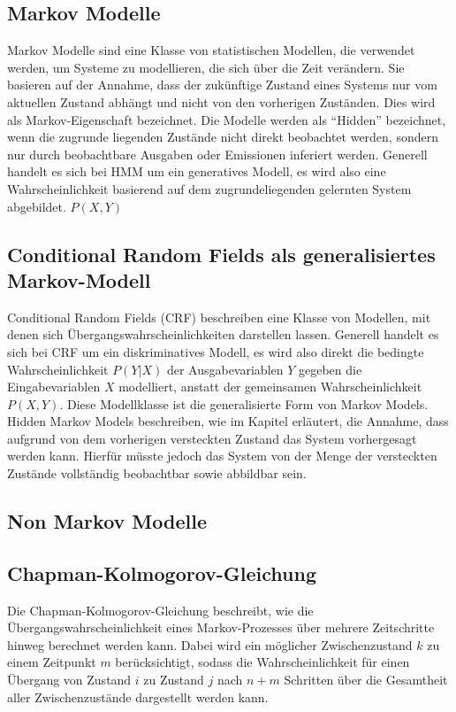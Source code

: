 \subsection{Markov Modelle}

Markov Modelle sind eine Klasse von statistischen Modellen, die verwendet werden, um Systeme zu modellieren, die sich über die Zeit verändern. Sie basieren auf der Annahme, dass der zukünftige Zustand eines Systems nur vom aktuellen Zustand abhängt und nicht von den vorherigen Zuständen. Dies wird als Markov-Eigenschaft bezeichnet.
Die Modelle werden als \enquote{Hidden} bezeichnet, wenn die zugrunde liegenden Zustände nicht direkt beobachtet werden, sondern nur durch beobachtbare Ausgaben oder Emissionen inferiert werden.
\newline
Generell handelt es sich bei HMM um ein generatives Modell, es wird also eine Wahrscheinlichkeit basierend auf dem zugrundeliegenden gelernten System abgebildet.
$P(X, Y)$


\subsection{Conditional Random Fields als generalisiertes Markov-Modell}

Conditional Random Fields (CRF) beschreiben eine Klasse von Modellen, mit denen sich Übergangswahrscheinlichkeiten darstellen lassen. Generell handelt es sich bei CRF um ein diskriminatives Modell, es wird also direkt die bedingte Wahrscheinlichkeit $P(Y|X)$ der Ausgabevariablen $Y$ gegeben die Eingabevariablen $X$ modelliert, anstatt der gemeinsamen Wahrscheinlichkeit $P(X, Y)$.
Diese Modellklasse ist die generalisierte Form von Markov Models. Hidden Markov Models beschreiben, wie im Kapitel erläutert, die Annahme, dass aufgrund von dem vorherigen versteckten Zustand das System vorhergesagt werden kann. Hierfür müsste jedoch das System von der Menge der versteckten Zustände vollständig beobachtbar sowie abbildbar sein.

\subsection{Non Markov Modelle}



\subsection{Chapman-Kolmogorov-Gleichung}

Die Chapman-Kolmogorov-Gleichung beschreibt, wie die Übergangswahrscheinlichkeit eines Markov-Prozesses über mehrere Zeitschritte hinweg berechnet werden kann. 
Dabei wird ein möglicher Zwischenzustand $k$ zu einem Zeitpunkt $m$ berücksichtigt, sodass die Wahrscheinlichkeit für einen Übergang von Zustand $i$ zu Zustand $j$ nach $n+m$ Schritten über die Gesamtheit aller Zwischenzustände dargestellt werden kann.

